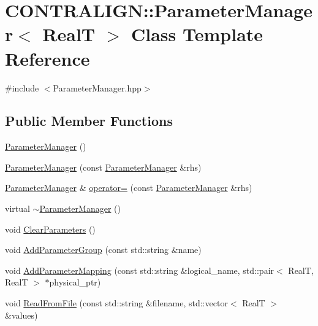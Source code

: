 \hypertarget{class_c_o_n_t_r_a_l_i_g_n_1_1_parameter_manager}{\section{C\+O\+N\+T\+R\+A\+L\+I\+G\+N\+:\+:Parameter\+Manager$<$ Real\+T $>$ Class Template Reference}
\label{class_c_o_n_t_r_a_l_i_g_n_1_1_parameter_manager}
}


{\ttfamily \#include $<$Parameter\+Manager.\+hpp$>$}

\subsection*{Public Member Functions}
\begin{DoxyCompactItemize}
\item 
\hyperlink{class_c_o_n_t_r_a_l_i_g_n_1_1_parameter_manager_acf5761f5c6da3ccf6dadcc32ddab086d}{Parameter\+Manager} ()
\item 
\hyperlink{class_c_o_n_t_r_a_l_i_g_n_1_1_parameter_manager_a28319548992949339ec13489b72bc6cc}{Parameter\+Manager} (const \hyperlink{class_c_o_n_t_r_a_l_i_g_n_1_1_parameter_manager}{Parameter\+Manager} \&rhs)
\item 
\hyperlink{class_c_o_n_t_r_a_l_i_g_n_1_1_parameter_manager}{Parameter\+Manager} \& \hyperlink{class_c_o_n_t_r_a_l_i_g_n_1_1_parameter_manager_a0eb5b3c2915e7af6ed0dd46cd0006fc5}{operator=} (const \hyperlink{class_c_o_n_t_r_a_l_i_g_n_1_1_parameter_manager}{Parameter\+Manager} \&rhs)
\item 
virtual \hyperlink{class_c_o_n_t_r_a_l_i_g_n_1_1_parameter_manager_aff6601bbafb934a2ee82650048062906}{$\sim$\+Parameter\+Manager} ()
\item 
void \hyperlink{class_c_o_n_t_r_a_l_i_g_n_1_1_parameter_manager_a2548d6948a60b5c0e5f8c8bf4674631f}{Clear\+Parameters} ()
\item 
void \hyperlink{class_c_o_n_t_r_a_l_i_g_n_1_1_parameter_manager_a5dd422fe934ddee56934324e00c54d5c}{Add\+Parameter\+Group} (const std\+::string \&name)
\item 
void \hyperlink{class_c_o_n_t_r_a_l_i_g_n_1_1_parameter_manager_ac10b74d055f4fddf68870a1a21e95fb3}{Add\+Parameter\+Mapping} (const std\+::string \&logical\+\_\+name, std\+::pair$<$ Real\+T, Real\+T $>$ $\ast$physical\+\_\+ptr)
\item 
void \hyperlink{class_c_o_n_t_r_a_l_i_g_n_1_1_parameter_manager_a252dfb04145a875f2ea6d0a66c021a97}{Read\+From\+File} (const std\+::string \&filename, std\+::vector$<$ Real\+T $>$ \&values)

\end{DoxyCompactItemize}
